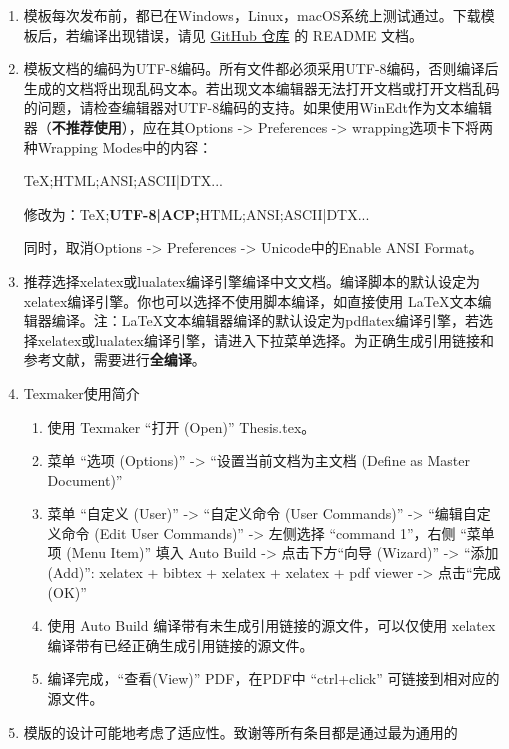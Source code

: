\begin{enumerate}
    \item 模板每次发布前，都已在Windows，Linux，macOS系统上测试通过。下载模板后，若编译出现错误，请见 \href{https://github.com/wang2000star/ucasthesis2026}{GitHub 仓库} 的 README 文档。

    \item 模板文档的编码为UTF-8编码。所有文件都必须采用UTF-8编码，否则编译后生成的文档将出现乱码文本。若出现文本编辑器无法打开文档或打开文档乱码的问题，请检查编辑器对UTF-8编码的支持。如果使用WinEdt作为文本编辑器（\textbf{不推荐使用}），应在其Options -> Preferences -> wrapping选项卡下将两种Wrapping Modes中的内容：
        
        TeX;HTML;ANSI;ASCII|DTX...
        
        修改为：TeX;\textbf{UTF-8|ACP;}HTML;ANSI;ASCII|DTX...
        
        同时，取消Options -> Preferences -> Unicode中的Enable ANSI Format。

    \item 推荐选择xelatex或lualatex编译引擎编译中文文档。编译脚本的默认设定为xelatex编译引擎。你也可以选择不使用脚本编译，如直接使用 \LaTeX{}文本编辑器编译。注：\LaTeX{}文本编辑器编译的默认设定为pdflatex编译引擎，若选择xelatex或lualatex编译引擎，请进入下拉菜单选择。为正确生成引用链接和参考文献，需要进行\textbf{全编译}。

    \item Texmaker使用简介
        \begin{enumerate}
            \footnotesize
            \item 使用 Texmaker “打开 (Open)” Thesis.tex。
            \item 菜单 “选项 (Options)” -> “设置当前文档为主文档 (Define as Master Document)”
            \item 菜单 “自定义 (User)” -> “自定义命令 (User Commands)” -> “编辑自定义命令 (Edit User Commands)” -> 左侧选择 “command 1”，右侧 “菜单项 (Menu Item)” 填入 Auto Build -> 点击下方“向导 (Wizard)” -> “添加 (Add)”: xelatex + bibtex + xelatex + xelatex + pdf viewer -> 点击“完成 (OK)”
            \item 使用 Auto Build 编译带有未生成引用链接的源文件，可以仅使用 xelatex 编译带有已经正确生成引用链接的源文件。
            \item 编译完成，“查看(View)” PDF，在PDF中 “ctrl+click” 可链接到相对应的源文件。
        \end{enumerate}
    
    \item 模版的设计可能地考虑了适应性。致谢等所有条目都是通过最为通用的


\end{enumerate}
